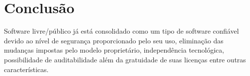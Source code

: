 \chapter{Conclusão}
\label{conclusao}

Software livre/público já está consolidado como um tipo de software confiável 
devido ao nível de segurança proporcionado pelo seu uso, eliminação das mudanças
impostas pelo modelo proprietário, independência tecnológica, possibilidade de
auditabilidade além da gratuidade de suas licenças entre outras características.
%






